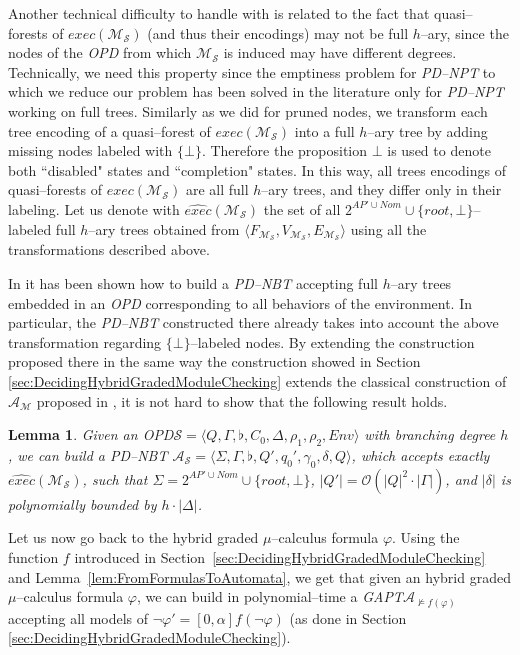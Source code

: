 \documentclass{LMCS}
\theoremstyle{plain}
\def \A             {\mathcal{A}}
\def \bottom        {\flat}
\def \edge          {E}
\def \GAPT          {\emph{GAPT}\xspace}
\def \M             {\mathcal{M}}
\def \node          {V}
\def \OPD           {\emph{OPD}\xspace}
\def \PDNBT         {\emph{PD--NBT}\xspace}
\def \PDNPT         {\emph{PD--NPT}\xspace}
\def \rr            {\mathit{root}}
\def \S             {\mathcal{S}}
\newcommand \tpl[1] {\langle #1 \rangle}
\newtheorem{lemma}{Lemma}
\begin{document}
Another technical difficulty to handle with is related to the fact
that quasi--forests of $exec(\M_{\S})$ (and thus their encodings)
may not be full $h$--ary, since the nodes of the \OPD from which
$\M_{\S}$ is induced may have different degrees. Technically, we
need this property since the emptiness problem for \PDNPT to which
we reduce our problem has been solved in the literature only for
\PDNPT working on full trees. Similarly as we did for pruned
nodes, we transform each tree encoding of a quasi--forest of
$exec(\M_{\S})$ into a full $h$--ary tree by adding missing nodes
labeled with $\{\bot\}$.
Therefore the proposition $\bot$ is used to denote both
``disabled" states and ``completion" states. In this way, all
trees encodings of quasi--forests of $exec(\M_{\S})$ are all full
$h$--ary trees, and they differ only in their labeling. Let us
denote with $\widehat{exec}(\M_{\S})$ the set of all $2^{AP' \cup
Nom} \cup \{\rr, \bot\}$--labeled full $h$--ary trees obtained
from $\tpl{F_{\M_{\S}},\node_{\M_{\S}}, \edge_{\M_{\S}}}$ using
all the transformations described above.

In \cite{BMP05} it has been shown how to build a \PDNBT accepting
full $h$--ary trees embedded in an \OPD corresponding to all
behaviors of the environment. In particular, the \PDNBT
constructed there already takes into account the above
transformation regarding $\{\bot\}$--labeled nodes. By extending
the construction proposed there in the same way the construction
showed in Section \ref{sec:DecidingHybridGradedModuleChecking}
extends the classical construction of $\A_{\M}$ proposed in
\cite{KVW01}, it is not hard to show that the following result
holds.

\begin{lemma}\label{lem:FromOpdToAutomata}
Given an \OPD $\S = \tpl{Q, \Gamma, \bottom, C_0, \Delta, \rho_1,
\rho_2, Env}$ with branching degree $h$, we can build a \PDNBT
$\A_{\S} = \tpl{\Sigma, \Gamma, \bottom, Q', q_0', \gamma_0,
\delta, Q}$, which accepts exactly $\widehat{exec}(\M_{\S})$, such
that $\Sigma = 2^{AP' \cup Nom} \cup \{\rr,\bot\}$, $|Q'| =
\mathcal{O}(|Q|^2 \cdot |\Gamma|)$, and $|\delta|$ is polynomially
bounded by $h \cdot |\Delta|$.
\end{lemma}

Let us now go back to the hybrid graded $\mu$--calculus formula
$\varphi$. Using the function $f$ introduced in
Section~\ref{sec:DecidingHybridGradedModuleChecking} and
Lemma~\ref{lem:FromFormulasToAutomata}, we get that given an
hybrid graded $\mu$--calculus formula $\varphi$, we can build in
polynomial--time a \GAPT $\A_{\not \models f(\varphi)}$ accepting
all models of $\neg\varphi' = [0,\alpha]f(\neg\varphi)$ (as done
in Section \ref{sec:DecidingHybridGradedModuleChecking}).
\end{document}
